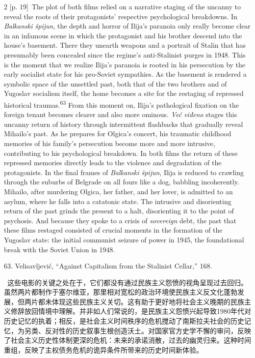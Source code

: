 \documentclass[10pt,a4paper]{article}
\begin{document}
\begin{paracol}{2}
{\scriptsize\color{gray} [p. 19]}\ The plot of both films relied on a narrative staging of the uncanny to reveal the roots of their protagonists’ respective psychological breakdowns. In \textit{Balkanski špijun}, the depth and horror of Ilija’s paranoia only really become clear in an infamous scene in which the protagonist and his brother descend into the house’s basement. There they unearth weapons and a portrait of Stalin that has presumably been concealed since the regime’s anti-Stalinist purges in 1948. This is the moment that we realize Ilija’s paranoia is rooted in his persecution by the early socialist state for his pro-Soviet sympathies. As the basement is rendered a symbolic space of the unsettled past, both that of the two brothers and of Yugoslav socialism itself, the home becomes a site for the restaging of repressed historical traumas.\nobreak\textsuperscript{63} From this moment on, Ilija’s pathological fixation on the foreign tenant becomes clearer and also more ominous. \textit{Već viđeno} stages this uncanny return of history through intermittent flashbacks that gradually reveal Mihailo’s past. As he prepares for Olgica’s concert, his traumatic childhood memories of his family’s persecution become more and more intrusive, contributing to his psychological breakdown. In both films the return of these repressed memories directly leads to the violence and degradation of the protagonists. In the final frames of \textit{Balkanski špijun}, Ilija is reduced to crawling through the suburbs of Belgrade on all fours like a dog, babbling incoherently. Mihailo, after murdering Olgica, her father, and her lover, is admitted to an asylum, where he falls into a catatonic state. The intrusive and disorienting return of the past grinds the present to a halt, disorienting it to the point of psychosis. And because they spoke to a crisis of \textit{sovereign} debt, the past that these films restaged consisted of crucial moments in the formation of the Yugoslav state: the initial communist seizure of power in 1945, the foundational break with the Soviet Union in 1948.\par{\small 63. Velisavljević, “Against Capitalism from the Stalinist Cellar,” 168.\par}
\switchcolumn*
{\scriptsize\color{gray} [p. 20]}\ 这些电影的关键之处在于，它们都没有通过民族主义怨愤的视角呈现过去回归。虽然两片都制作于塞尔维亚，那里相对宽松的政治环境使民族主义反文化蓬勃发展，但两片都未体现这些民族主义关切。这有助于更好地将社会主义晚期的民族主义修辞放回情境中理解。并非如人们常说的，是民族主义怨愤兴起导致1980年代对历史记忆的执着；相反，是社会主义时间秩序的危机搅动了南斯拉夫社会的历史记忆，为另类、反对性的历史叙事生根创造沃土。对国家官方史学不懈的审问，反映了社会主义历史性体制更深的危机：未来的承诺消散，过去的幽灵归来。这种时间重组，反映了主权债务危机的诡异条件所带来的历史时间新体验。\par

\end{paracol}
\end{document}

